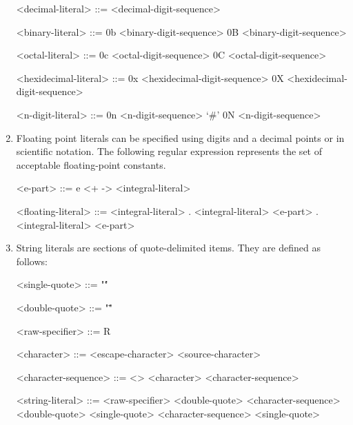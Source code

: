 \begin{enumerate}
\begin{grammar}
		<decimal-literal> ::=
			<decimal-digit-sequence>
	
		<binary-literal> ::=
			0b <binary-digit-sequence>
			\alt 0B <binary-digit-sequence>
		
		<octal-literal> ::=
			0c <octal-digit-sequence>
			\alt 0C <octal-digit-sequence>
		
		<hexidecimal-literal> ::=
			0x <hexidecimal-digit-sequence>
			\alt 0X <hexidecimal-digit-sequence>
			
		<n-digit-literal> ::=
			0n <n-digit-sequence> `#'
			\alt 0N <n-digit-sequence>
	\end{grammar}

	\item Floating point literals can be specified using digits and a decimal points or in scientific notation. The following regular expression represents the set of acceptable floating-point constants.
	\begin{grammar}
		<e-part> ::=
			e <+ \textbar{} -> <integral-literal>
		
		<floating-literal> ::=
			<integral-literal> . <integral-literal>
			\alt <integral-literal> . <integral-literal>
	\end{grammar}
	
	\item String literals are sections of quote-delimited items. They are defined as follows:
	\begin{grammar}
		<single-quote> ::= "\'"
		
		<double-quote> ::= "\""
		
		<raw-specifier> ::= R\lit*{$_{opt}$}
		
		<character> ::= <escape-character>
			<source-character>
		
		<character-sequence> ::= <>
		\alt <character> <character-sequence>
		
		<string-literal> ::=
		<raw-specifier> <double-quote> <character-sequence> <double-quote>
		\alt <raw-specifier> <single-quote> <character-sequence> <single-quote>
	\end{grammar}
	
\end{enumerate}
